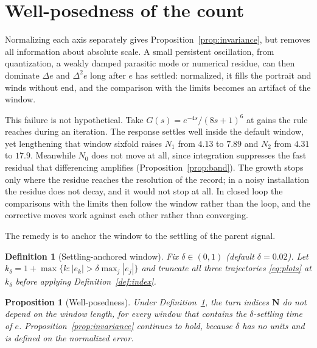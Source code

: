 \documentclass[final,3p,times,twocolumn]{elsarticle}
\newtheorem{proposition}{Proposition}
\newtheorem{definition}{Definition}
\begin{document}
\section{Well-posedness of the count}
\label{sec:wellposed}

Normalizing each axis separately gives
Proposition~\ref{prop:invariance}, but removes all information about
absolute scale. A small persistent oscillation, from quantization, a weakly damped
parasitic mode or numerical residue, can then dominate $\Delta e$ and
$\Delta^2 e$ long after $e$ has settled: normalized, it fills the
portrait and winds without end, and the comparison with the limits
becomes an artifact of the window.

This failure is not hypothetical. Take $G(s) = e^{-4s}/(8s+1)^6$ at
gains the rule reaches during an iteration. The response settles well
inside the default window, yet lengthening that window sixfold raises
$N_1$ from $4.13$ to $7.89$ and $N_2$ from $4.31$ to $17.9$. Meanwhile
$N_0$ does not move at all, since integration suppresses the fast
residual that differencing amplifies
(Proposition~\ref{prop:band}). The growth stops only where the residue
reaches the resolution of the record; in a noisy installation the residue
does not decay, and it would not stop at all. In closed loop the comparisons with the limits then follow the window
rather than the loop, and the corrective moves work against each other
rather than converging.

The remedy is to anchor the window to the settling of the parent signal.

\begin{definition}[Settling-anchored window]\label{def:guard}
Fix $\delta \in (0,1)$ (default $\delta = 0.02$). Let
$k_\delta = 1 + \max\{k : |e_k| > \delta \max_j |e_j|\}$ and truncate all
three trajectories \eqref{eq:plots} at $k_\delta$ before applying
Definition~\ref{def:index}.
\end{definition}

\begin{proposition}[Well-posedness]\label{prop:wellposed}
Under Definition~\ref{def:guard}, the turn indices $\mathbf N$ do not
depend on the window length, for every window that contains the
$\delta$-settling time of $e$. Proposition~\ref{prop:invariance}
continues to hold, because $\delta$ has no units and is defined on the
normalized error.
\end{proposition}
\end{document}
